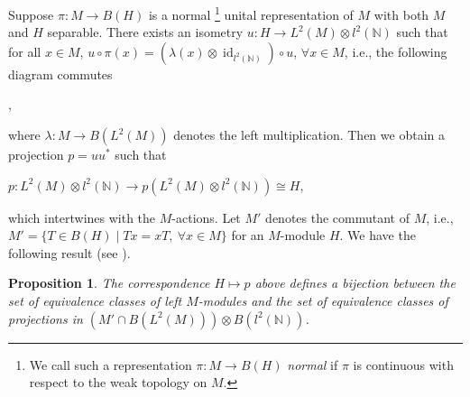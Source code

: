 \documentclass[11pt]{article}
\theoremstyle{plain}
\newtheorem{proposition}[theorem]{Proposition}
\theoremstyle{remark}
\theoremstyle{definition}
\DeclareMathOperator{\id}{id}
\begin{document}

Suppose $\pi\colon M\to B(H)$ is a normal \footnote{We call such a representation $\pi\colon M\to B(H)$ {\it normal} if $\pi$ is continuous with respect to the weak topology on $M$.} unital representation of $M$ with both $M$ and $H$ separable. 
There exists an isometry $u\colon H\to L^2(M)\otimes l^2(\mathbb{N})$ such that for all $x\in M$, 
$u\circ\pi(x)=(\lambda(x)\otimes\id_{l^2(\mathbb{N})} )\circ u$, $\forall x\in M$, i.e., the following diagram commutes 
\begin{center}
,
\end{center}
where $\lambda\colon M\to B(L^2(M))$ denotes the left multiplication.  
Then we obtain a projection $p=uu^*$ such that
\begin{center}
    $p\colon L^2(M)\otimes l^2(\mathbb{N})\to p(L^2(M)\otimes l^2(\mathbb{N}))\cong H$, 
\end{center}
which intertwines with the $M$-actions. 
Let $M'$ denotes the commutant of $M$, i.e., $M'=\{T\in B(H)\mid Tx=xT,~\forall x \in M\}$ for an $M$-module $H$. 
We have the following result (see \cite[Proposition 8.2.3]{APintrII1}). 

\begin{proposition}\label{ptrdim}
The correspondence $H\mapsto p$ above defines a bijection between the set of equivalence classes of left $M$-modules and the set of equivalence classes of projections in $(M'\cap B(L^2(M)))\otimes B(l^2(\mathbb{N}))$. 
\end{proposition}
\end{document}
